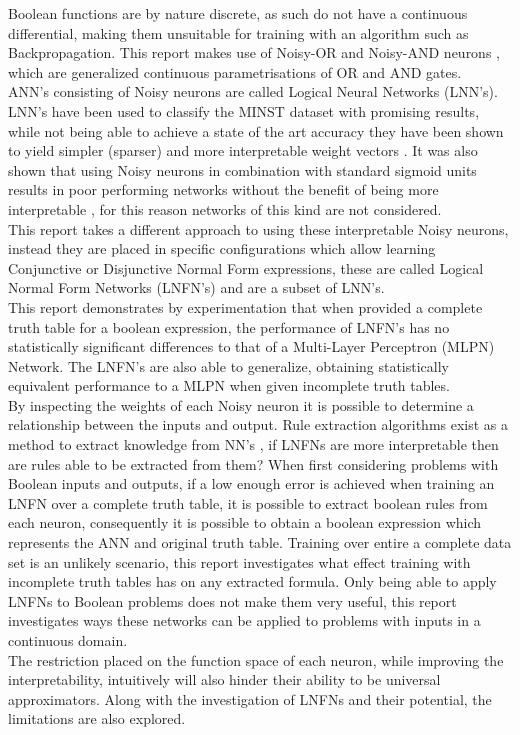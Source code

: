 Boolean functions are by nature discrete, as such do not have a continuous differential, making them unsuitable for training with an algorithm such as Backpropagation. This report makes use of Noisy-OR and Noisy-AND neurons \cite{LearningLogicalActivations}, which are generalized continuous parametrisations of OR and AND gates.\\

ANN's consisting of Noisy neurons are called Logical Neural Networks (LNN's). LNN's have been used to classify the MINST dataset with promising results, while not being able to achieve a state of the art accuracy they have been shown to yield simpler (sparser) and more interpretable weight vectors \cite{LearningLogicalActivations}. It was also shown that using Noisy neurons in combination with standard sigmoid units results in poor performing networks without the benefit of being more interpretable \cite{LearningLogicalActivations}, for this reason networks of this kind are not considered.\\

This report takes a different approach to using these interpretable Noisy neurons, instead they are placed in specific configurations which allow learning Conjunctive or Disjunctive Normal Form expressions, these are called Logical Normal Form Networks (LNFN's) and are a subset of LNN's.\\

This report demonstrates by experimentation that when provided a complete truth table for a boolean expression, the performance of LNFN's has no statistically significant differences to that of a Multi-Layer Perceptron (MLPN) Network. The LNFN's are also able to generalize, obtaining statistically equivalent performance to a MLPN when given incomplete truth tables.\\

By inspecting the weights of each Noisy neuron it is possible to determine a relationship between the inputs and output. Rule extraction algorithms exist as a method to extract knowledge from NN's \cite{andrews1995survey}, if LNFNs are more interpretable then are rules able to be extracted from them? When first considering problems with Boolean inputs and outputs, if a low enough error is achieved when training an LNFN over a complete truth table, it is possible to extract boolean rules from each neuron, consequently it is possible to obtain a boolean expression which represents the ANN and original truth table. Training over entire a complete data set is an unlikely scenario, this report investigates what effect training with incomplete truth tables has on any extracted formula. Only being able to apply LNFNs to Boolean problems does not make them very useful, this report investigates ways these networks can be applied to problems with inputs in a continuous domain.\\

The restriction placed on the function space of each neuron, while improving the interpretability, intuitively will also hinder their ability to be universal approximators. Along with the investigation of LNFNs and their potential, the limitations are also explored.

